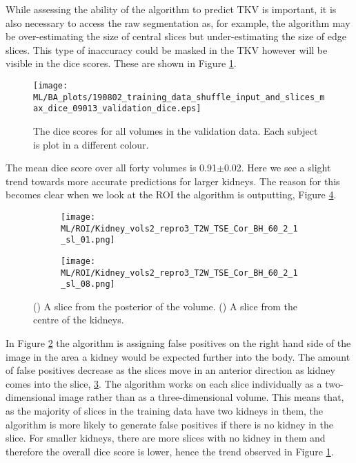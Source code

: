 While assessing the ability of the algorithm to predict \ac{TKV} is important, it is also necessary to access the raw segmentation as, for example, the algorithm may be over-estimating the size of central slices but under-estimating the size of edge slices. This type of inaccuracy could be masked in the \ac{TKV} however will be visible in the dice scores. These are shown in Figure \ref{fig:ml_validation_dice}.

\begin{figure}[H]
	\centering
	\texttt{[image: ML/BA\_plots/190802\_training\_data\_shuffle\_input\_and\_slices\_max\_dice\_09013\_validation\_dice.eps]}
	\caption{The dice scores for all volumes in the validation data. Each subject is plot in a different colour.}
	\label{fig:ml_validation_dice}
\end{figure}

The mean dice score over all forty volumes is 0.91$\pm$0.02. Here we see a slight trend towards more accurate predictions for larger kidneys. The reason for this becomes clear when we look at the \ac{ROI} the algorithm is outputting, Figure \ref{fig:ml_roi}.

\begin{figure}[H]
	\centering
	\begin{subfigure}[c]{0.47\textwidth}
		\centering
		\texttt{[image: ML/ROI/Kidney\_vols2\_repro3\_T2W\_TSE\_Cor\_BH\_60\_2\_1\_sl\_01.png]}
		\caption{}
		\label{fig:ml_roi_outside}
	\end{subfigure}
	\hfill
	\begin{subfigure}[c]{0.47\textwidth}
		\centering
		\texttt{[image: ML/ROI/Kidney\_vols2\_repro3\_T2W\_TSE\_Cor\_BH\_60\_2\_1\_sl\_08.png]}
		\caption{}
		\label{fig:ml_roi_inside}
	\end{subfigure}
	\caption{() A slice from the posterior of the volume. () A slice from the centre of the kidneys.}
	\label{fig:ml_roi}
\end{figure}

In Figure \ref{fig:ml_roi_outside} the algorithm is assigning false positives on the right hand side of the image in the area a kidney would be expected further into the body. The amount of false positives decrease as the slices move in an anterior direction as kidney comes into the slice, \ref{fig:ml_roi_inside}. The algorithm works on each slice individually as a two-dimensional image rather than as a three-dimensional volume. This means that, as the majority of slices in the training data have two kidneys in them, the algorithm is more likely to generate false positives if there is no kidney in the slice. For smaller kidneys, there are more slices with no kidney in them and therefore the overall dice score is lower, hence the trend observed in Figure \ref{fig:ml_validation_dice}.

